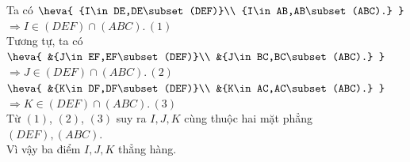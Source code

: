 \begin{ex}
{\begin{center}
		\end{center}
		Ta  có $\heva{
		{I\in DE,DE\subset (DEF)}\\ 
		{I\in AB,AB\subset (ABC).} 
		}$  \\
		$\Rightarrow I\in (DEF)\cap  (ABC).\,(1)$\\
		Tương tự,  ta có $\heva{
		 &{J\in EF,EF\subset (DEF)}\\
		&{J\in  BC,BC\subset (ABC).}
		 }$\\
		$\Rightarrow  J\in (DEF)\cap (ABC).\,(2)$\\
		 $\heva{
		&{K\in  DF,DF\subset (DEF)}\\
		 &{K\in AC,AC\subset (ABC).}
		}$ \\$\Rightarrow  K\in (DEF)\cap (ABC).\, (3)$\\
		Từ $(1)$, $(2)$, $(3)$ suy ra $ I,J,K$ cùng thuộc  hai mặt phẳng $ (DEF),(ABC)$.\\
	Vì vậy ba điểm $ I,J,K$  thẳng hàng.}
\end{ex}

